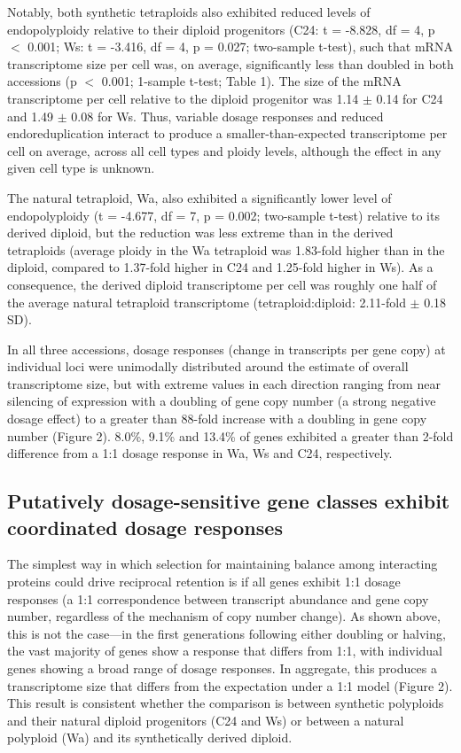 \documentclass[11pt]{article}
\begin{document}
Notably, both synthetic tetraploids also exhibited reduced levels of endopolyploidy relative to their diploid progenitors (C24: t = -8.828, df = 4, p $<$ 0.001; Ws: t = -3.416, df = 4, p = 0.027; two-sample t-test), such that mRNA transcriptome size per cell was, on average, significantly less than doubled in both accessions (p $<$ 0.001; 1-sample t-test; Table 1). The size of the mRNA transcriptome per cell relative to the diploid progenitor was 1.14 $\pm$ 0.14 for C24 and 1.49 $\pm$ 0.08 for Ws. Thus, variable dosage responses and reduced endoreduplication interact to produce a smaller-than-expected transcriptome per cell on average, across all cell types and ploidy levels, although the effect in any given cell type is unknown.

The natural tetraploid, Wa, also exhibited a significantly lower level of endopolyploidy (t = -4.677, df = 7, p = 0.002; two-sample t-test) relative to its derived diploid, but the reduction was less extreme than in the derived tetraploids (average ploidy in the Wa tetraploid was 1.83-fold higher than in the diploid, compared to 1.37-fold higher in C24 and 1.25-fold higher in Ws). As a consequence, the derived diploid transcriptome per cell was roughly one half of the average natural tetraploid transcriptome (tetraploid:diploid: 2.11-fold $\pm$ 0.18 SD). 

In all three accessions, dosage responses (change in transcripts per gene copy) at individual loci were unimodally distributed around the estimate of overall transcriptome size, but with extreme values in each direction ranging from near silencing of expression with a doubling of gene copy number (a strong negative dosage effect) to a greater than 88-fold increase with a doubling in gene copy number (Figure 2). 8.0\%, 9.1\% and 13.4\% of genes exhibited a greater than 2-fold difference from a 1:1 dosage response in Wa, Ws and C24, respectively. 

\subsection*{Putatively dosage-sensitive gene classes exhibit coordinated dosage responses}

The simplest way in which selection for maintaining balance among interacting proteins could drive reciprocal retention is if all genes exhibit 1:1 dosage responses (a 1:1 correspondence between transcript abundance and gene copy number, regardless of the mechanism of copy number change). As shown above, this is not the case---in the first generations following either doubling or halving, the vast majority of genes show a response that differs from 1:1, with individual genes showing a broad range of dosage responses. In aggregate, this produces a transcriptome size that differs from the expectation under a 1:1 model (Figure 2). This result is consistent whether the comparison is between synthetic polyploids and their natural diploid progenitors (C24 and Ws)  or between a natural polyploid (Wa) and its synthetically derived diploid.
 
\end{document}
